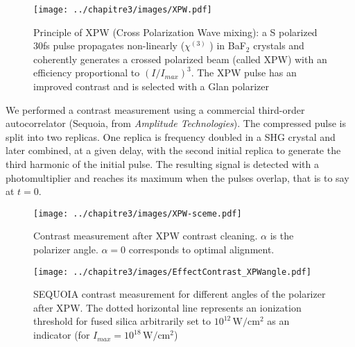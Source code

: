\begin{figure}[H]
\centering
\texttt{[image: ../chapitre3/images/XPW.pdf]}\\
\caption{\label{fig:TiSa_scheme} Principle of XPW (Cross Polarization Wave mixing): a S polarized 30fs pulse propagates non-linearly ($\chi^{(3)}$  ) in BaF$_2$ crystals and coherently generates a crossed polarized beam (called XPW) with an efficiency proportional to $(I/I_{max})^3$. The XPW pulse has an improved contrast and is selected with a Glan polarizer}
\end{figure}

\noindent We performed a contrast measurement using a commercial third-order autocorrelator (Sequoia, from \textit{Amplitude Technologies}). The compressed pulse is split into two replicas. One replica is frequency doubled in a SHG crystal and later combined, at a given delay, with the second initial replica to generate the third harmonic of the initial pulse. The resulting signal is detected with a photomultiplier and reaches its maximum when the pulses overlap, that is to say at $t=0$. 

\begin{figure}[H]
\centering
\texttt{[image: ../chapitre3/images/XPW-sceme.pdf]}\\
\caption{\label{fig:XPW-sceme} Contrast measurement after XPW contrast cleaning. $\alpha$ is the polarizer angle. $\alpha =0$ corresponds to optimal alignment.}
\end{figure}

\begin{figure}[H]
\centering
\texttt{[image: ../chapitre3/images/EffectContrast\_XPWangle.pdf]}\\
\caption{\label{fig:EffectContrast_XPWangle2} SEQUOIA contrast measurement for different angles of the polarizer after XPW. The dotted horizontal line represents an ionization threshold for fused silica arbitrarily set to $10^{12}\,\mathrm{W/cm^2}$ as an indicator (for $I_{max} = 10^{18}\,\mathrm{W/cm^2}$)}
\end{figure}




